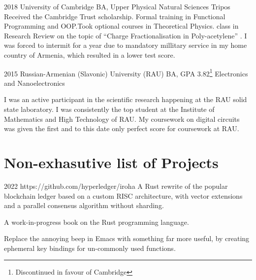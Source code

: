 \documentclass{CurriculumVitae}[10pt, condensed]
\begin{document}
{%
          {2018}%
          {University of Cambridge}%
          {BA, Upper }%
          {Physical Natural Sciences Tripos}%
          {
            Received the Cambridge Trust scholarship. Formal training
            in Functional Programming and OOP.\@ Took optional courses
            in Theoretical Physics.  class in Research Review
            on the topic of ``Charge Fractionalisation in Poly-acetylene''%
            \cite{charge-frac}. I was forced to intermit for a year due to
            mandatory millitary service in my home country of Armenia,
            which resulted in a lower test score.
          }

%
          {2015}%
          {Russian-Armenian (Slavonic) University (RAU)}
          {BA, GPA 3.82\footnote{Discontinued in favour of Cambridge}}%
          {Electronics and Nanoelectronics}%
          {%

            I was an active participant\cite{cu2o,measurement} in the
            scientific research happening at the RAU solid state
            laboratory.  I was consistently the top student at the
            Institute of Mathematics and High Technology of RAU.  My
            coursework on digital circuits was given the first and to
            this date only perfect score for coursework at RAU.
          }%

\vfill
\section*{Non-exhasutive list of Projects}%
%
%
        {2022}%
        {https://github.com/hyperledger/iroha}%
        {%
          A Rust rewrite of the popular blockchain ledger based on a custom
          RISC architecture, with vector extensions and a parallel consensus
          algorithm without sharding.
        }%


  {%
    A work-in-progress book on the Rust programming language.
  }%

  {%
    Replace the annoying beep in Emacs with something far more useful,
    by creating ephemeral key bindings for un-commonly used functions.
  }%

}
\end{document}
